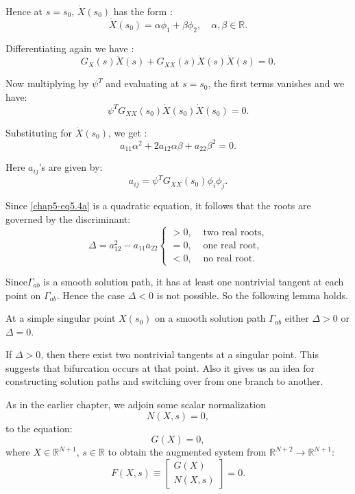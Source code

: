 Hence at $s=s_0$, $\dot{X}(s_0)$ has the form : 
$$
\dot{X}(s_0) = \alpha \phi _1 + \beta \phi_2,  \quad \alpha, \beta
\in  \mathbb{R}. 
$$

Differentiating again we have :
$$
G_X(s)\ddot{X}(s) + G_{XX}(s)\dot{X}(s) \dot{X}(s) = 0. 
$$
 
Now multiplying by $\psi^T$ and evaluating at $s=s_0$, the first
terms vanishes and we have: 
$$
\psi ^T G_{XX}(s_0)\dot{X}(s_0) \dot{X}(s_0)= 0. 
$$
 
Substituting for $\dot{X}(s_0)$, we get :
\begin{equation*}
a_{11} \alpha^2 + 2a _{12}\alpha \beta  + a_{22}
\beta^2=0. \tag{5.4a}\label{chap5-eq5.4a}  
\end{equation*}

Here $a_{ij}$'s are given by:
\begin{equation*}
a_{ij}= \psi^T G_{XX}(s_0) \phi_i \phi_j. \tag{5.4b}\label{chap5-eq5.4b}  
\end{equation*}

Since \eqref{chap5-eq5.4a} is a quadratic equation, it follows that
the roots are governed by  the discriminant: 
\begin{equation*}
\Delta = a^2_{12}-a_{11}a_{22} 
\begin{cases}
> 0,  & \text{ two real roots},\\ 
=0, & \text{ one real root}, \\
<0, & \text{ no real root}. 
\end{cases}\tag{5.4c}\label{chap5-eq5.4c}
\end{equation*}

Since\pageoriginale $\Gamma_{ab}$ is a smooth solution path, it has at
least one nontrivial tangent at each point on $\Gamma_{ab}$. Hence the case
$\Delta < 0$ is not possible. So the following lemma holds. 

\setcounter{chaplemma}{4}
\begin{chaplemma}\label{chap5-lem5.5}
At a simple singular point $X(s_0)$  on a smooth
  solution path $\Gamma _{ab}$ either $ \Delta >0$ or $\Delta = 0$.
\end{chaplemma}

If $\Delta >0$, then  there exist two nontrivial tangents at a
singular point.  This suggests that bifurcation occurs at that
point. Also it gives us an idea for constructing solution paths and
switching over from one branch to another. 

As in the earlier chapter, we adjoin some scalar normalization 
$$ 
N(X,s) =0,
$$
to the equation:
$$
G(X) =0,
$$
where $X \in  \mathbb{R} ^{N+1}$,  $s \in  \mathbb{R}$
to obtain the augmented system from $\mathbb{R}^{N+2} \rightarrow
\mathbb{R}^{N+1}$: 
\begin{equation*}
F(X,s) \equiv
\begin{bmatrix}
G(X)\\
N(X,s)
\end{bmatrix} =0. \tag{5.6a}\label{chap5-eq5.6a}  
\end{equation*}

